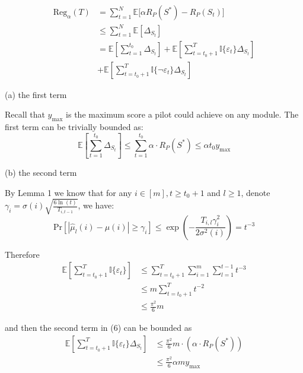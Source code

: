 \documentclass[opre,sglanonrev]{informs4}
\begin{document}
\begin{equation}
    \label{eq:0}
	\begin{aligned}
		  \text{Reg}_{\alpha}(T) &= \sum_{t=1}^{N}\mathbb{E}\big[\alpha R_P(S^*) - R_P(S_t)\big]\\
		  &\leq \sum_{t=1}^{N}\mathbb{E}[\Delta_{S_t}]\\
		  &=\mathbb{E}[\sum_{t=1}^{t_0}\Delta_{S_t}]+\mathbb{E}[\sum_{t=t_0+1}^{T}\mathbb{I}\{\varepsilon_t\}\Delta_{S_t}]\\
		  &+\mathbb{E}[\sum_{t=t_0+1}^{T}\mathbb{I}\{\lnot \varepsilon_t\}\Delta_{S_t}]
	\end{aligned}
\end{equation}

(a) the first term 

Recall that $y_{\text{max}}$ is the maximum score a pilot could achieve on any module. The first term can be trivially bounded as:
\begin{equation}
	\mathbb{E}[\sum_{t=1}^{t_0}\Delta_{S_t}] \leq \sum_{t=1}^{t_0}\alpha \cdot R_P(S^*) \leq \alpha t_0 y_{\text{max}}
\end{equation}

(b) the second term 

By Lemma 1 we know that for any $i \in [m],t\geq t_0+1$ and $l\geq 1$, denote $\gamma_i = \sigma(i)\sqrt{\frac{6\ln(t)}{T_{i,t-1}}}$, we have:
$$
	\text{Pr}[|\hat{\mu}_{l}(i)-\mu(i)|\geq \gamma_i] \leq \exp(-\frac{T_{i,l}\gamma_i^2}{2\sigma^2(i)}) = t^{-3}
$$

Therefore
\begin{equation*}
	\begin{aligned}
		\mathbb{E}[\sum_{t=t_0+1}^{T}\mathbb{I}\{\varepsilon_t\}]
		&\leq \sum_{t=t_0+1}^{T} \sum_{i=1}^{m} \sum_{l=1}^{t-1}t^{-3} \\
		&\leq m \sum_{t=t_0+1}^{T}t^{-2} \\
		&\leq \frac{\pi^2}{6}m
	\end{aligned}
\end{equation*}

and then the second term in (6) can be bounded as
\begin{equation}
	\begin{aligned}
		\mathbb{E}[\sum_{t=t_0+1}^{T}\mathbb{I}\{\varepsilon_t\}\Delta_{S_t}]&\leq \frac{\pi^2}{6}m \cdot (\alpha \cdot R_P(S^*))\\
        &\leq \frac{\pi^2}{6}\alpha m y_{\text{max}}
 	\end{aligned}
\end{equation}
\end{document}
